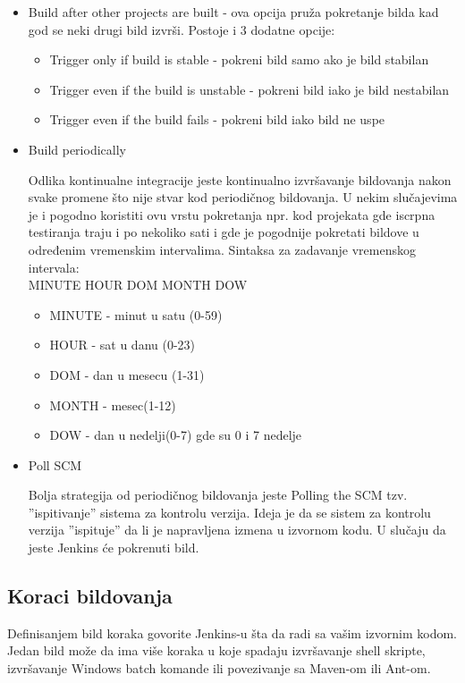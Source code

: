 \begin{itemize}
  
\item Build after other projects are built - ova opcija pruža pokretanje bilda kad god se neki drugi bild izvrši. Postoje i 3 dodatne opcije:
\begin{itemize}  
\item Trigger only if build is stable - pokreni bild samo ako je bild stabilan
\item Trigger even if the build is unstable - pokreni bild iako je bild nestabilan
\item Trigger even if the build fails - pokreni bild iako bild ne uspe
\end{itemize}

\item Build periodically

Odlika kontinualne integracije jeste kontinualno izvršavanje bildovanja nakon svake promene što nije stvar kod periodičnog bildovanja. U nekim slučajevima je i pogodno koristiti ovu vrstu pokretanja npr. kod projekata gde iscrpna testiranja traju i po nekoliko sati i gde je pogodnije pokretati bildove u određenim vremenskim intervalima.
Sintaksa za zadavanje vremenskog intervala: \\
MINUTE HOUR DOM MONTH DOW
\begin{itemize}
\item MINUTE - minut u satu (0-59)
\item HOUR - sat u danu (0-23)
\item DOM - dan u mesecu (1-31)
\item MONTH - mesec(1-12)
\item DOW - dan u nedelji(0-7) gde su 0 i 7 nedelje
\end{itemize}

\item Poll SCM

Bolja strategija od periodičnog bildovanja jeste Polling the SCM tzv. ''ispitivanje'' sistema za kontrolu verzija. Ideja je da se sistem za kontrolu verzija ''ispituje'' da li je napravljena izmena u izvornom kodu. U slučaju da jeste Jenkins će pokrenuti bild.
\end{itemize}

\subsection{Koraci bildovanja}

Definisanjem bild koraka govorite Jenkins-u šta da radi sa vašim izvornim kodom. Jedan bild može da ima više koraka u koje spadaju izvršavanje shell skripte, izvršavanje Windows batch komande ili povezivanje sa Maven-om ili Ant-om.

